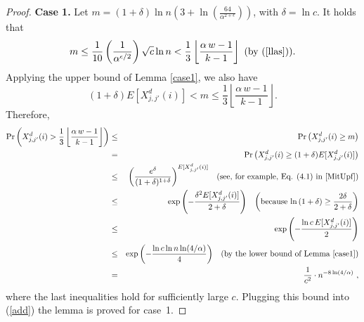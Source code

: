 \documentclass[11pt]{article}
\begin{document}
\begin{proof}
\medskip
\textbf{Case 1.}
Let $m = (1 + \delta)  \ln n \left(3 + \ln\left(\frac{64}{\alpha^{2+\epsilon }}  \right) \right)$, with
$\delta = \ln c$. It holds that
\[
   m \le \frac{1}{10} \left( \frac{1}{\alpha^{\epsilon/2}}  \right) \sqrt{c} \ln n
   < \frac{1}{3}\left \lfloor \frac{\alpha\, w - 1}{k-1} \right \rfloor \text{ (by (\ref{llas}))}.
\]
Applying the upper bound of Lemma \ref{case1}, we also have
\[
    (1 + \delta) E[X^d_{j,j'}(i)] < m \le \frac{1}{3}\left \lfloor \frac{\alpha\, w - 1}{k-1} \right \rfloor .
\]
Therefore,
\begin{eqnarray*}
    \Pr\left(X^d_{j,j'}(i) > \frac{1}{3}\left \lfloor \frac{\alpha\, w - 1}{k-1} \right \rfloor \right)
    & \le &
	\Pr\left(X^d_{j,j'}(i) \ge m \right) \\
	& = & \Pr\left(X^d_{j,j'}(i)
	\ge (1+\delta)  E[X^d_{j,j'}(i)] \right)   \\
    & \le & \left ( \frac{e^{\delta}}{(1+\delta)^{1+\delta}} \right )^{E[X^d_{j,j'}(i)]} \;\;\; 
    \text{(see, for example, Eq. (4.1) in \cite{MitUpf})} \\ 
    & \le & \exp \left (-\frac{\delta^2 E[X^d_{j,j'}(i)]}{2 + \delta} \right ) \;\;\; 
    \left(\text{because $\ln\left(1+\delta \right) \ge \frac{2\delta}{2+\delta}$}\right) \\
    & \le & \exp \left (-\frac{\ln c\, E[X^d_{j,j'}(i)]}{2} \right ) \\ 
    & \le & \exp \left (-\frac{\ln c \ln n \ln (4/\alpha)}{4} \right ) \;\;\; \text{(by the lower bound of Lemma \ref{case1})}\\      
	& = & \frac{1}{c^2}\cdot n^{-8\ln(4/\alpha)} 
 \ ,
\end{eqnarray*}
where the last inequalities hold for sufficiently large $c$.
Plugging this bound into (\ref{add}) the lemma is proved for case~1.


\end{proof}
\end{document}
